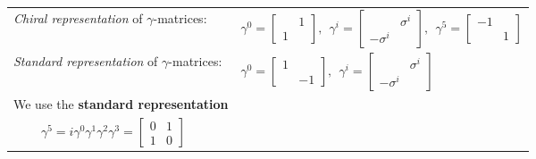 \documentclass[14pt]{article}
\begin{document}
\begin{tabular}{ll}
{\it Chiral representation} of $\gamma$-matrices: &
$
	\gamma^0 = \left[
	\begin{array}{cc}
	        &   1 \\
            1   &
	\end{array}\right],~~
	\gamma^i = \left[
	\begin{array}{cc}
	        &   \sigma^i \\
            -\sigma^i   &
	\end{array}\right],~~
	\gamma^5 = \left[
	\begin{array}{cc}
	    -1  &    \\
                &  1
	\end{array}\right]
$ \\
{\it Standard representation} of $\gamma$-matrices: &
$
	\gamma^0 = \left[
	\begin{array}{cc}
	    1   &     \\
                &   -1
	\end{array}\right],~~
	\gamma^i = \left[
	\begin{array}{cc}
	        &   \sigma^i \\
            -\sigma^i   &
	\end{array}\right]
$ \\
We use the {\bf standard representation} &\\
$~~~~~~~~~~\gamma^5 = i \gamma^0 \gamma^1 \gamma^2 \gamma^3 =
	\left[
	\begin{array}{cc}
	     0  &  1  \\
             1  &  0
	\end{array}\right] $

\end{tabular}
\end{document}
